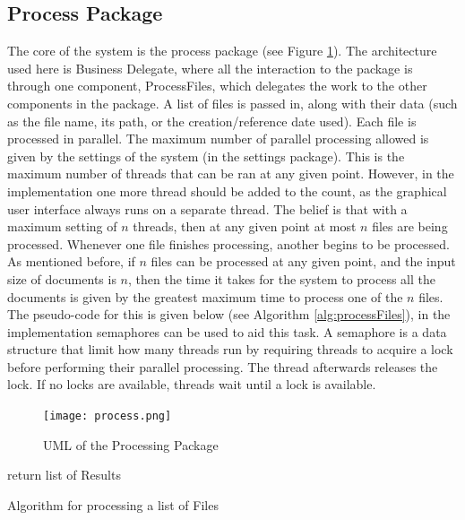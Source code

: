 \subsection{Process Package}
\par The core of the system is the process package (see Figure \ref{fig:process}). The architecture used here is Business Delegate, where all the interaction to the package is through one component, ProcessFiles, which delegates the work to the other components in the package. A list of files is passed in, along with their data (such as the file name, its path, or the creation/reference date used). Each file is processed in parallel. The maximum number of parallel processing allowed is given by the settings of the system (in the settings package). This is the maximum number of threads that can be ran at any given point. However, in the implementation one more thread should be added to the count, as the graphical user interface always runs on a separate thread. The belief is that with a maximum setting of $n$ threads, then at any given point at most $n$ files are being processed. Whenever one file finishes processing, another begins to be processed. As mentioned before, if $n$ files can be processed at any given point, and the input size of documents is $n$, then the time it takes for the system to process all the documents is given by the greatest maximum time to process one of the $n$ files. The pseudo-code for this is given below (see Algorithm \ref{alg:processFiles}), in the implementation semaphores can be used to aid this task. A semaphore is a data structure that limit how many threads run by requiring threads to acquire a lock before performing their parallel processing. The thread afterwards releases the lock. If no locks are available, threads wait until a lock is available.
\begin{figure}[H]
\caption{UML of the Processing Package}
\label{fig:process}
\texttt{[image: process.png]}
\centering
\end{figure}
\begin{algorithm}
return list of Results\;
\caption{Algorithm for processing a list of Files}
\label{alg:processFiles}
\end{algorithm}
